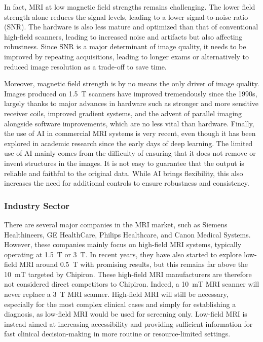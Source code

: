 \documentclass[12pt]{article}
\begin{document}
In fact, MRI at low magnetic field strengths remains challenging. 
The lower field strength alone reduces the signal levels, leading to a lower signal-to-noise ratio (SNR).
The hardware is also less mature and optimized than that of conventional high-field scanners, leading to increased noise and artifacts but also affecting robustness.
Since SNR is a major determinant of image quality, it needs to be improved by repeating acquisitions, leading to longer exams or alternatively to reduced image resolution as a trade-off to save time.
\vspace{0.5cm}

Moreover, magnetic field strength is by no means the only driver of image quality. 
Images produced on 1.5~T scanners have improved tremendously since the 1990s, largely thanks to major advances in hardware such as stronger and more sensitive receiver coils, improved gradient systems, and the advent of parallel imaging alongside software improvements, which are no less vital than hardware.
Finally, the use of AI in commercial MRI systems is very recent, even though it has been explored in academic research since the early days of deep learning.
The limited use of AI mainly comes from the difficulty of ensuring that it does not remove or invent structures in the images.
It is not easy to guarantee that the output is reliable and faithful to the original data. 
While AI brings flexibility, this also increases the need for additional controls to ensure robustness and consistency.

\subsubsection{Industry Sector}

There are several major companies in the MRI market, such as Siemens Healthineers, GE HealthCare, Philips Healthcare, and Canon Medical Systems.
However, these companies mainly focus on high-field MRI systems, typically operating at 1.5~T or 3~T.
In recent years, they have also started to explore low-field MRI around 0.5~T with promising results, but this remains far above the 10~mT targeted by Chipiron.
These high-field MRI manufacturers are therefore not considered direct competitors to Chipiron.
Indeed, a 10~mT MRI scanner will never replace a 3~T MRI scanner.
High-field MRI will still be necessary, especially for the most complex clinical cases and simply for establishing a diagnosis, as low-field MRI would be used for screening only.
Low-field MRI is instead aimed at increasing accessibility and providing sufficient information for fast clinical decision-making in more routine or resource-limited settings.
\vspace{0.5cm}
\end{document}
